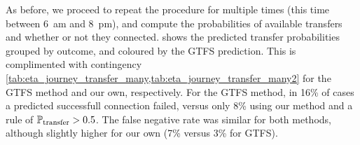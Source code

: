 \begin{knitrout}\small
{}\color{fgcolor}\begin{table}

\caption{\label{tab:eta_journey_transfer_res}Transfer probabilities}
\centering
\fontsize{8}{10}\selectfont
{}
\end{table}


\end{knitrout}


As before, we proceed to repeat the procedure for multiple times (this time between 6~am and 8~pm), and compute the probabilities of available transfers and whether or not they connected.  shows the predicted transfer probabilities grouped by outcome, and coloured by the GTFS prediction. This is complimented with contingency \cref{tab:eta_journey_transfer_many,tab:eta_journey_transfer_many2} for the GTFS method and our own, respectively. For the GTFS method, in 16\% of cases a predicted successfull connection failed, versus only 8\% using our method and a rule of $\mathbb{P}_\text{transfer} > 0.5$. The false negative rate was similar for both methods, although slightly higher for our own (7\% versus 3\% for GTFS).


